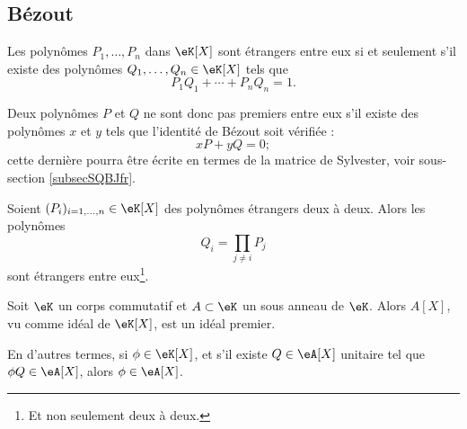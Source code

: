 \subsection{Bézout}

\begin{theorem}[Bézout] \label{ThoBezoutOuGmLB}     
    Les polynômes \( P_1,\ldots,P_n\) dans \( \eK[X]\) sont étrangers entre eux si et seulement s'il existe des polynômes \( Q_1,\ldots,Q_n\in\eK[X]\) tels que
    \begin{equation}
        P_1Q_1+\cdots+P_nQ_n=1.
    \end{equation}
\end{theorem}

Deux polynômes \( P\) et \( Q\) ne sont donc pas premiers entre eux s'il existe des polynômes \( x\) et \( y\) tels que l'identité de Bézout soit vérifiée :
\begin{equation}    \label{EqkbbzAi}
    xP+yQ=0;
\end{equation}
cette dernière pourra être écrite en termes de la matrice de Sylvester, voir sous-section \ref{subsecSQBJfr}.

\begin{lemma}       \label{LemuALZHn}
    Soient \( (P_i)_{i=1,\ldots,n}\in \eK[X]\) des polynômes étrangers deux à deux. Alors les polynômes \begin{equation} Q_i=\prod_{j\neq i}P_j \end{equation}
    sont étrangers entre eux\footnote{Et non seulement deux à deux.}.
\end{lemma}

\begin{lemma}   \label{LemzwkYdn}
    Soit \( \eK\) un corps commutatif et \( A\subset \eK\) un sous
    anneau de \( \eK\).  Alors \( A[X] \), vu comme idéal de \( \eK[X]
    \), est un idéal premier.

    En d'autres termes, si \( \phi\in \eK[X]\), et s'il existe \( Q\in \eA[X]\) unitaire tel que \( \phi Q\in \eA[X]\), alors \( \phi\in \eA[X]\).
\end{lemma}

